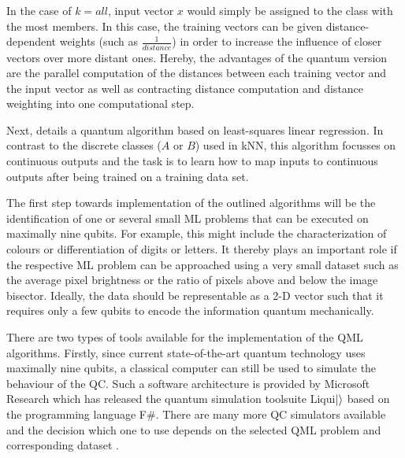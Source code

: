 \documentclass[a4paper]{article}
\newcommand*{\0}{$\ket{0}$}
\newcommand*{\1}{$\ket{1}$}
\begin{document}

In the case of $k = all$, input vector $x$ would simply be assigned to the class with the most members. In this case, the training vectors can be given distance-dependent weights (such as $\frac{1}{distance}$) in order to increase the influence of closer vectors over more distant ones. Hereby, the advantages of the quantum version are the parallel computation of the distances between each training vector and the input vector as well as contracting distance computation and distance weighting into one computational step.

Next, \cite{Schuld2016} details a quantum algorithm based on least-squares linear regression. In contrast to the discrete classes ($A$ or $B$) used in kNN, this algorithm focusses on continuous outputs and the task is to learn how to map inputs to continuous outputs after being trained on a training data set.

The first step towards implementation of the outlined algorithms will be the identification of one or several small ML problems that can be executed on maximally nine qubits. For example, this might include the characterization of colours or differentiation of digits or letters. It thereby plays an important role if the respective ML problem can be approached using a very small dataset such as the average pixel brightness or the ratio of pixels above and below the image bisector. Ideally, the data should be representable as a 2-D vector such that it requires only a few qubits to encode the information quantum mechanically.

There are two types of tools available for the implementation of the QML algorithms. Firstly, since current state-of-the-art quantum technology uses maximally nine qubits, a classical computer can still be used to simulate the behaviour of the QC. Such a software architecture is provided by Microsoft Research which has released the quantum simulation toolsuite Liqui$\ket{}$ based on the programming language F\#. There are many more QC simulators available and the decision which one to use depends on the selected QML problem and corresponding dataset \citep{quantiki}.
\end{document}
